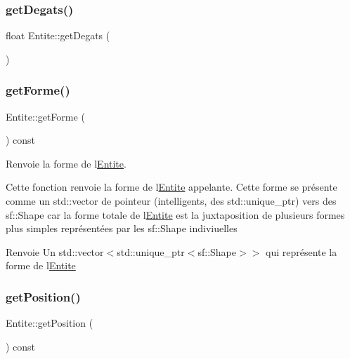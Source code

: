 \mbox{\label{class_entite_aec50d0b36c1cbe54054f7c469efc581a}} 
\subsubsection{\texorpdfstring{get\+Degats()}{getDegats()}}
{\footnotesize\ttfamily float Entite\+::get\+Degats (\begin{DoxyParamCaption}{ }\end{DoxyParamCaption})}

\mbox{\label{class_entite_ad7314f276ea1808e98cfd8b7d0e900c8}} 
\subsubsection{\texorpdfstring{get\+Forme()}{getForme()}}
{\footnotesize\ttfamily Entite\+::get\+Forme (\begin{DoxyParamCaption}{ }\end{DoxyParamCaption}) const\hspace{0.3cm}{\ttfamily [inline]}}



Renvoie la forme de l\textquotesingle{}\hyperlink{class_entite}{Entite}. 

Cette fonction renvoie la forme de l\textquotesingle{}\hyperlink{class_entite}{Entite} appelante. Cette forme se présente comme un {\ttfamily std\+::vector} de pointeur (intelligents, des {\ttfamily std\+::unique\+\_\+ptr}) vers des {\ttfamily sf\+::\+Shape} car la forme totale de l\textquotesingle{}\hyperlink{class_entite}{Entite} est la juxtaposition de plusieurs formes plus simples représentées par les {\ttfamily sf\+::\+Shape} indiviuelles \begin{DoxyReturn}{Renvoie}
Un {\ttfamily std\+::vector$<$std\+::unique\+\_\+ptr$<$sf\+::\+Shape$>$$>$} qui représente la forme de l\textquotesingle{}\hyperlink{class_entite}{Entite} 
\end{DoxyReturn}
\mbox{\label{class_entite_a6f6fd1e1f9f6ad44f0ecc74961a774d9}} 
\subsubsection{\texorpdfstring{get\+Position()}{getPosition()}}
{\footnotesize\ttfamily Entite\+::get\+Position (\begin{DoxyParamCaption}{ }\end{DoxyParamCaption}) const}



